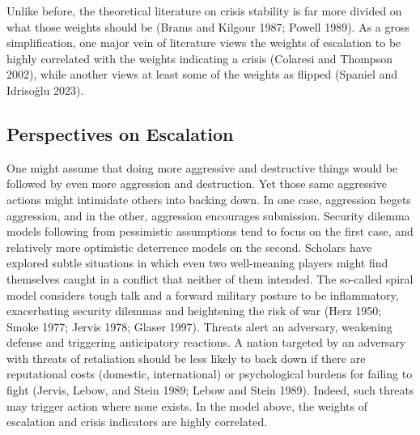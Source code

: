 \documentclass[
]{article}
\begin{document}
Unlike before, the theoretical literature on crisis stability is far
more divided on what those weights should be (Brams and Kilgour 1987;
Powell 1989). As a gross simplification, one major vein of literature
views the weights of escalation to be highly correlated with the weights
indicating a crisis (Colaresi and Thompson 2002), while another views at
least some of the weights as flipped (Spaniel and Idrisoğlu 2023).

\subsection{Perspectives on
Escalation}\label{perspectives-on-escalation}

One might assume that doing more aggressive and destructive things would
be followed by even more aggression and destruction. Yet those same
aggressive actions might intimidate others into backing down. In one
case, aggression begets aggression, and in the other, aggression
encourages submission. Security dilemma models following from
pessimistic assumptions tend to focus on the first case, and relatively
more optimistic deterrence models on the second. Scholars have explored
subtle situations in which even two well-meaning players might find
themselves caught in a conflict that neither of them intended. The
so-called spiral model considers tough talk and a forward military
posture to be inflammatory, exacerbating security dilemmas and
heightening the risk of war (Herz 1950; Smoke 1977; Jervis 1978; Glaser
1997). Threats alert an adversary, weakening defense and triggering
anticipatory reactions. A nation targeted by an adversary with threats
of retaliation should be less likely to back down if there are
reputational costs (domestic, international) or psychological burdens
for failing to fight (Jervis, Lebow, and Stein 1989; Lebow and Stein
1989). Indeed, such threats may trigger action where none exists. In the
model above, the weights of escalation and crisis indicators are highly
correlated.
\end{document}
